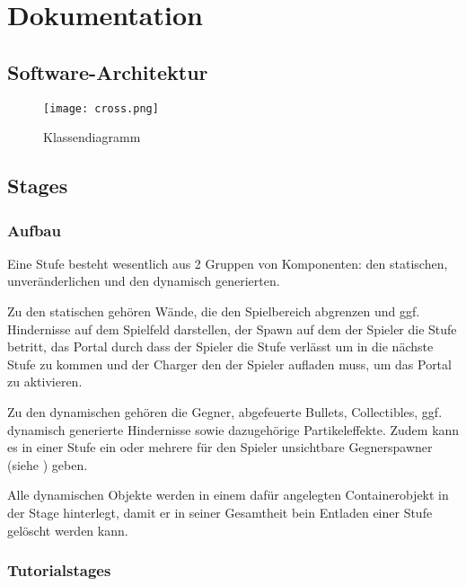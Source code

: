 \documentclass[a4paper,10pt,ngerman,fontsize=12pt]{scrreprt}
\begin{document}
\chapter{Dokumentation}




\section{Software-Architektur}

\lipsum[1]

\begin{figure}[h!]
\begin{center}
\texttt{[image: cross.png]}
\caption{Klassendiagramm}
\label{fig:classdiag}
\end{center}
\end{figure}
    



\section{Stages}
\label{sect:stages}


\subsection{Aufbau}

Eine Stufe besteht wesentlich aus 2 Gruppen von Komponenten: den statischen, unveränderlichen und den dynamisch generierten.

Zu den statischen gehören Wände, die den Spielbereich abgrenzen und ggf. Hindernisse auf dem Spielfeld darstellen, der Spawn auf dem der Spieler die Stufe betritt, das Portal durch dass der Spieler die Stufe verlässt um in die nächste Stufe zu kommen und der Charger den der Spieler aufladen muss, um das Portal zu aktivieren.

Zu den dynamischen gehören die Gegner, abgefeuerte Bullets, Collectibles, ggf. dynamisch generierte Hindernisse sowie dazugehörige Partikeleffekte. Zudem kann es in einer Stufe ein oder mehrere für den Spieler unsichtbare Gegnerspawner (siehe ) geben.

Alle dynamischen Objekte werden in einem dafür angelegten Containerobjekt in der Stage hinterlegt, damit er in seiner Gesamtheit bein Entladen einer Stufe gelöscht werden kann.



\subsection{Tutorialstages}
\end{document}
